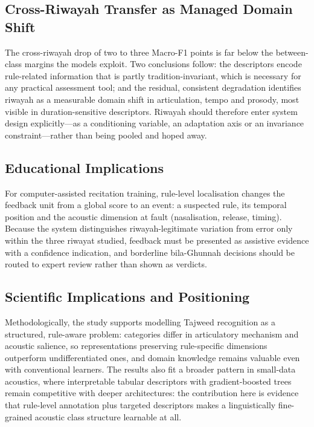 \documentclass[runningheads]{llncs}
\begin{document}
\subsection{Cross-Riwayah Transfer as Managed Domain Shift}

The cross-riwayah drop of two to three Macro-F1 points is far below the
between-class margins the models exploit. Two conclusions follow: the
descriptors encode rule-related information that is partly tradition-invariant,
which is necessary for any practical assessment tool; and the residual,
consistent degradation identifies riwayah as a measurable domain shift in
articulation, tempo and prosody, most visible in duration-sensitive descriptors.
Riwayah should therefore enter system design explicitly---as a conditioning
variable, an adaptation axis or an invariance constraint---rather than being
pooled and hoped away.

\subsection{Educational Implications}

For computer-assisted recitation training, rule-level localisation changes the
feedback unit from a global score to an event: a suspected rule, its temporal
position and the acoustic dimension at fault (nasalisation, release, timing).
Because the system distinguishes riwayah-legitimate variation from error only
within the three riwayat studied, feedback must be presented as assistive
evidence with a confidence indication, and borderline bila-Ghunnah decisions
should be routed to expert review rather than shown as verdicts.

\subsection{Scientific Implications and Positioning}

Methodologically, the study supports modelling Tajweed recognition as a
structured, rule-aware problem: categories differ in articulatory mechanism and
acoustic salience, so representations preserving rule-specific dimensions
outperform undifferentiated ones, and domain knowledge remains valuable even
with conventional learners. The results also fit a broader pattern in small-data
acoustics, where interpretable tabular descriptors with gradient-boosted trees
remain competitive with deeper architectures: the contribution here is evidence
that rule-level annotation plus targeted descriptors makes a linguistically
fine-grained acoustic class structure learnable at all.
\end{document}
